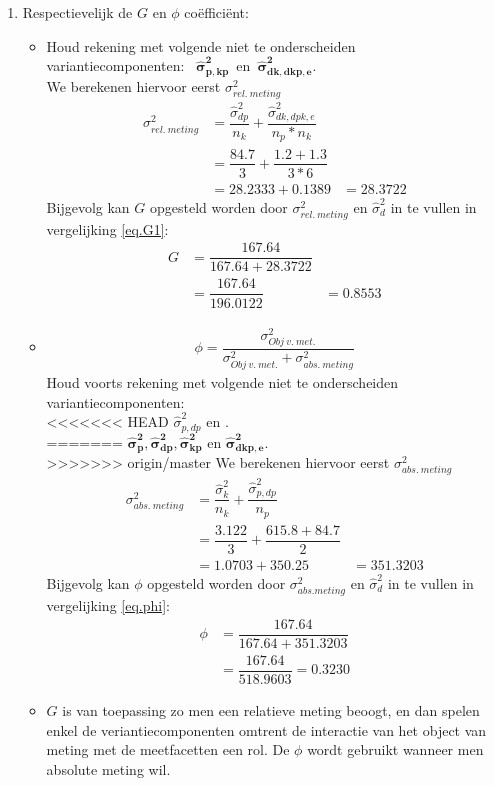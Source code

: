{\begin{enumerate}
\item Respectievelijk de $G$ en $\phi$ co\"effici\"ent:
\begin{itemize}
	\item	Houd rekening met volgende niet te onderscheiden variantiecomponenten:~ 
	$ \bm{\hat{\sigma}^2_{p,kp}} $~en~$\bm{\hat{\sigma}^2_{dk, dkp, e} }$.\\
	We berekenen hiervoor eerst $\sigma^2_{rel.~meting}$
	\begin{align*}
		\sigma^2_{rel.~meting} 	&=  \dfrac{\hat{\sigma}^2_{dp}}{n_k} + \dfrac{\hat{\sigma}^2_{dk,dpk,e}}{n_p*n_k} \\
								&=  \dfrac{{84.7}}{3} + \dfrac{{1.2 + 1.3}}{3*6}\\
								&= 28.2333 + 0.1389 &= 28.3722
	\end{align*}
	Bijgevolg kan $G$ opgesteld worden door $\sigma^2_{rel.~meting}$ en $\hat{\sigma}^2_{d}$ in te vullen in vergelijking \ref{eq.G1}:
	\begin{align*}
		G 	&=\dfrac{167.64}{167.64+  28.3722}\\
			&=\dfrac{167.64}{ 196.0122}&=0.8553
	\end{align*}

	\item
	\begin{align}
		\phi =\dfrac{\sigma^2_{Obj~v.~met.}}{\sigma^2_{Obj~v.~met.}+ \sigma^2_{abs.~meting}} \label{eq.phi}
	\end{align}
	Houd voorts rekening met volgende niet te onderscheiden variantiecomponenten:~ \\
<<<<<<< HEAD
	$\hat{\sigma}^2_{p, dp}$ en .\\
=======
	$\bm{\hat{\sigma}^2_p},\bm{\hat{\sigma}^2_{dp}} , \bm{\hat{\sigma}^2_{kp}} \text{ en } \bm{\hat{\sigma}^2_{dkp, e}}$.\\
>>>>>>> origin/master
	We berekenen hiervoor eerst $\sigma^2_{abs.~meting}$
	\begin{align*}
		\sigma^2_{abs.~meting} 	&=  \dfrac{\hat{\sigma}^2_{k}}{n_k} + \dfrac{\hat{\sigma}^2_{p, dp}}{n_p} \\
								&=  \dfrac{{3.122}}{3} + \dfrac{{615.8+84.7}}{2}\\
								&=  1.0703 + 350.25 &= 351.3203
	\end{align*}
	Bijgevolg kan $\phi$ opgesteld worden door $\sigma^2_{abs. meting}$ en $\hat{\sigma}^2_{d}$ in te vullen in vergelijking \ref{eq.phi}:
	\begin{align*}
		\phi 	&=\dfrac{167.64}{167.64+  351.3203}\\
				&=\dfrac{167.64}{518.9603}=0.3230
	\end{align*}
	\item $G$ is van toepassing zo men een relatieve meting beoogt, en dan spelen
enkel de veriantiecomponenten omtrent de interactie van het object van meting
met de meetfacetten een rol. De $\phi$ wordt gebruikt wanneer men absolute meting
wil.
	\end{itemize}
	
	
\end{enumerate}
}
